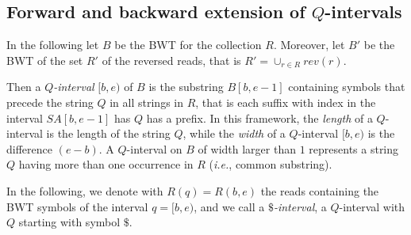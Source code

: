 \documentclass[runningheads,envcountsame,a4paper]{llncs}
\newcommand{\ie}{\textit{i.e.},\xspace}
\begin{document}



\subsection{Forward and backward extension of $Q$-intervals}

In the following let $B$ be the BWT for the collection $R$.
Moreover, let $B'$ be the BWT of the set $R'$ of the reversed reads,
that is $R' = \cup_{r \in R}rev(r)$.


Then a \emph{$Q$-interval} $[b,e)$ of $B$ is the substring $B[b, e -1]$
containing symbols that precede the string $Q$ in all strings in $R$,
that is each suffix with index in the interval $SA[b, e-1]$ has $Q$ has
a prefix.
In this framework, the \emph{length} of a $Q$-interval is the length of
the string $Q$, while the \emph{width} of a $Q$-interval $[b, e)$ is the
difference $(e-b)$.
A $Q$-interval on $B$ of width larger than $1$ represents a string $Q$
having more than one occurrence in $R$ (\ie common substring).

In the following, we denote with $R(q)=R(b,e)$ the reads containing the
BWT symbols of the interval $q=[b,e)$, and we call a \emph{$\$$-interval}, a
$Q$-interval with $Q$ starting with symbol $\$$.
\end{document}
